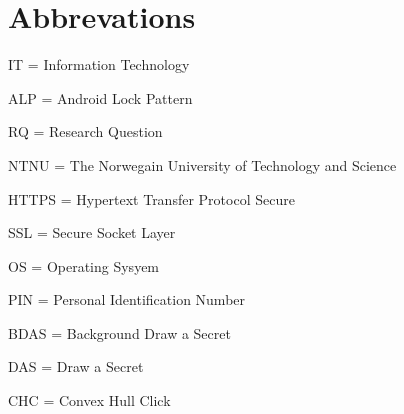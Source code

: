 \section*{Abbrevations}

	IT = Information Technology

	ALP = Android Lock Pattern
	
	RQ = Research Question

	NTNU = The Norwegain University of Technology and Science

	HTTPS = Hypertext Transfer Protocol Secure

	SSL = Secure Socket Layer

	OS = Operating Sysyem

	PIN = Personal Identification Number
	
	BDAS = Background Draw a Secret

	DAS = Draw a Secret

	CHC = Convex Hull Click
